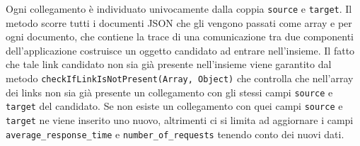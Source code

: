 	

	Ogni collegamento è individuato univocamente dalla coppia \texttt{source} e \texttt{target}.
	Il metodo scorre tutti i documenti JSON che gli vengono passati come array e per ogni documento, che contiene la trace di una comunicazione tra due componenti dell'applicazione costruisce un oggetto candidato ad entrare nell'insieme. Il fatto che tale link candidato non sia già presente nell'insieme viene garantito dal metodo \texttt{checkIfLinkIsNotPresent(Array, Object)} che controlla che nell'array dei links non sia già presente un collegamento con gli stessi campi \texttt{source} e \texttt{target} del candidato. Se non esiste un collegamento con quei campi \texttt{source} e \texttt{target} ne viene inserito uno nuovo, altrimenti ci si limita ad aggiornare i campi \texttt{average\_response\_time} e \texttt{number\_of\_requests} tenendo conto dei nuovi dati. 


